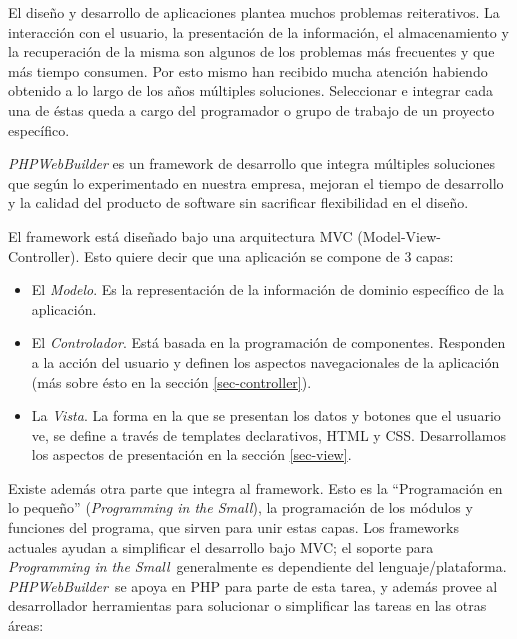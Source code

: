 \documentclass[a4paper,10pt]{article}
\newcommand{\PITS}{\emph{Programming in the Small}} %
\newcommand{\PWB}{\emph{PHPWebBuilder}}
\begin{document}
El diseño y desarrollo de aplicaciones plantea muchos problemas reiterativos. La interacción con el usuario, la presentación de la información, el almacenamiento y la recuperación de la misma son algunos de los problemas más frecuentes y que más tiempo consumen.
Por esto mismo han recibido mucha atención habiendo obtenido a lo largo de los años múltiples soluciones. Seleccionar e integrar cada una de éstas queda a cargo del programador o grupo de trabajo de un proyecto específico.

\PWB \cite{PWB} es un framework de desarrollo que integra múltiples soluciones que según lo experimentado en nuestra empresa, mejoran el tiempo de desarrollo y la calidad del producto de software sin sacrificar flexibilidad en el diseño.

El framework está diseñado bajo una arquitectura MVC (Model-View-Controller)\cite{mvc}.
Esto quiere decir que una aplicación se compone de 3 capas:
\begin{itemize}
\item El \emph{Modelo}. Es la representación de la información de dominio específico de la aplicación.
\item El \emph{Controlador}. Está basada en la programación de componentes. Responden a la acción del usuario y definen los aspectos navegacionales de la aplicación (más sobre ésto en la sección \ref{sec-controller}).
\item La \emph{Vista}. La forma en la que se presentan los datos y botones que el usuario ve, se define a través de templates declarativos, HTML y CSS. Desarrollamos los aspectos de presentación en la sección \ref{sec-view}.
\end{itemize}

Existe además otra parte que integra al framework. Esto es la ``Programación en lo pequeño'' (\PITS), la programación de los módulos y funciones del programa, que sirven para unir estas capas. Los frameworks actuales ayudan a simplificar el desarrollo bajo MVC; el soporte para \PITS \ generalmente es dependiente del lenguaje/plataforma. \PWB \ se apoya en PHP para parte de esta tarea, y además provee al desarrollador herramientas para solucionar o simplificar las tareas en las otras áreas:
\end{document}

